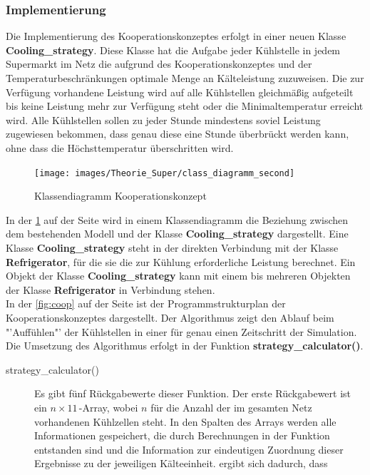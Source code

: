 \subsubsection*{Implementierung}
Die Implementierung des Kooperationskonzeptes erfolgt in einer neuen Klasse
\textbf{Cooling\_strategy}. Diese Klasse hat die Aufgabe jeder K\"uhlstelle in
jedem Supermarkt im Netz die aufgrund des Kooperationskonzeptes und der
Temperaturbeschr\"ankungen optimale Menge an K\"alteleistung zuzuweisen. Die zur
Verf\"ugung vorhandene Leistung wird auf alle K\"uhlstellen gleichm\"a\ss ig
aufgeteilt bis keine Leistung mehr zur Verf\"ugung steht oder die
Minimaltemperatur erreicht wird. Alle K\"uhlstellen sollen zu jeder Stunde
mindestens soviel Leistung zugewiesen bekommen, dass genau diese eine Stunde
\"uberbr\"uckt werden kann, ohne dass die H\"ochsttemperatur \"uberschritten
wird.
\begin{figure}[h!]
	\begin{center}
	\texttt{[image: images/Theorie\_Super/class\_diagramm\_second]}
	\end{center}
\caption{Klassendiagramm Kooperationskonzept}
\label{fig:klasskoop}
\end{figure}

In der \cref{fig:klasskoop} auf der Seite \pageref{fig:klasskoop} wird in einem
Klassendiagramm die Beziehung zwischen dem bestehenden Modell und der Klasse
\textbf{Cooling\_strategy} dargestellt. Eine Klasse \textbf{Cooling\_strategy}
steht in der direkten Verbindung mit der Klasse \textbf{Refrigerator}, f\"ur die
sie die zur K\"uhlung erforderliche Leistung berechnet. Ein Objekt der Klasse
\textbf{Cooling\_strategy} kann mit einem bis mehreren Objekten der Klasse
\textbf{Refrigerator} in Verbindung stehen.\\

In der \cref{fig:coop} auf der Seite \pageref{fig:coop} ist der
Programmstrukturplan der Kooperationskonzeptes dargestellt. Der Algorithmus
zeigt den Ablauf beim "'Auff\"uhlen"' der K\"uhlstellen in einer f\"ur genau
einen Zeitschritt der Simulation. Die Umsetzung des Algorithmus erfolgt in der
Funktion \textbf{strategy\_calculator()}.

\begin{description}
\item[strategy\_calculator()] Es gibt f\"unf R\"uckgabewerte dieser Funktion.
Der erste R\"uckgabewert ist ein $n\times11\,$-Array, wobei $n$ f\"ur die Anzahl
der im gesamten Netz vorhandenen K\"uhlzellen steht. In den Spalten des Arrays
werden alle Informationen gespeichert, die durch Berechnungen in der Funktion
entstanden sind und die Information zur eindeutigen Zuordnung dieser Ergebnisse
zu der jeweiligen K\"alteeinheit. ergibt sich dadurch, dass 
\end{description}

